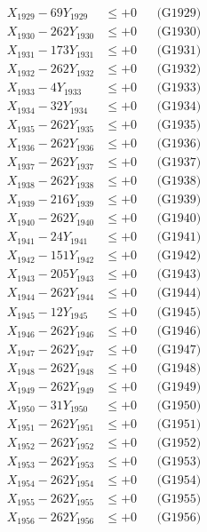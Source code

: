 \documentclass[a4paper,10pt]{article}
\begin{document}
{\begin{align}
X_{1929} - 69Y_{1929} &\leq +0 && \text{(G1929)} \\
X_{1930} - 262Y_{1930} &\leq +0 && \text{(G1930)} \\
\allowbreak
X_{1931} - 173Y_{1931} &\leq +0 && \text{(G1931)} \\
X_{1932} - 262Y_{1932} &\leq +0 && \text{(G1932)} \\
X_{1933} - 4Y_{1933} &\leq +0 && \text{(G1933)} \\
X_{1934} - 32Y_{1934} &\leq +0 && \text{(G1934)} \\
X_{1935} - 262Y_{1935} &\leq +0 && \text{(G1935)} \\
X_{1936} - 262Y_{1936} &\leq +0 && \text{(G1936)} \\
X_{1937} - 262Y_{1937} &\leq +0 && \text{(G1937)} \\
X_{1938} - 262Y_{1938} &\leq +0 && \text{(G1938)} \\
X_{1939} - 216Y_{1939} &\leq +0 && \text{(G1939)} \\
X_{1940} - 262Y_{1940} &\leq +0 && \text{(G1940)} \\
\allowbreak
X_{1941} - 24Y_{1941} &\leq +0 && \text{(G1941)} \\
X_{1942} - 151Y_{1942} &\leq +0 && \text{(G1942)} \\
X_{1943} - 205Y_{1943} &\leq +0 && \text{(G1943)} \\
X_{1944} - 262Y_{1944} &\leq +0 && \text{(G1944)} \\
X_{1945} - 12Y_{1945} &\leq +0 && \text{(G1945)} \\
X_{1946} - 262Y_{1946} &\leq +0 && \text{(G1946)} \\
X_{1947} - 262Y_{1947} &\leq +0 && \text{(G1947)} \\
X_{1948} - 262Y_{1948} &\leq +0 && \text{(G1948)} \\
X_{1949} - 262Y_{1949} &\leq +0 && \text{(G1949)} \\
X_{1950} - 31Y_{1950} &\leq +0 && \text{(G1950)} \\
\allowbreak
X_{1951} - 262Y_{1951} &\leq +0 && \text{(G1951)} \\
X_{1952} - 262Y_{1952} &\leq +0 && \text{(G1952)} \\
X_{1953} - 262Y_{1953} &\leq +0 && \text{(G1953)} \\
X_{1954} - 262Y_{1954} &\leq +0 && \text{(G1954)} \\
X_{1955} - 262Y_{1955} &\leq +0 && \text{(G1955)} \\
X_{1956} - 262Y_{1956} &\leq +0 && \text{(G1956)} \\

\end{align}}
\end{document}
